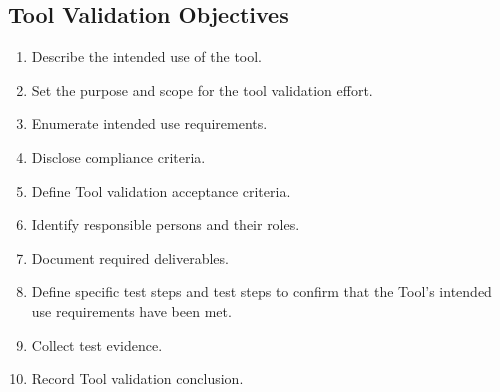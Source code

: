 \subsection{Tool Validation Objectives}
\begin{enumerate}
  \item Describe the intended use of the tool.
  \item Set the purpose and scope for the tool validation effort.
  \item Enumerate intended use requirements.
  \item Disclose compliance criteria.
  \item Define Tool validation acceptance criteria.
  \item Identify responsible persons and their roles.
  \item Document required deliverables.
  \item Define specific test steps and test steps to confirm that the Tool's
    intended use requirements have been met.
  \item Collect test evidence.
  \item Record Tool validation conclusion.
\end{enumerate}
